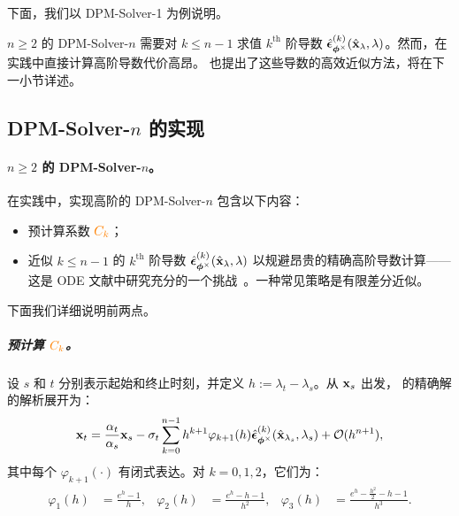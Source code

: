 下面，我们以 DPM-Solver-1 为例说明。



$n \ge 2$ 的 DPM-Solver-$n$ 需要对 $k \le n-1$ 求值 $k^{\text{th}}$ 阶导数 {\color{cyan}$\hat{\bm{\epsilon}}_{\bm{\phi}^\times}^{(k)}(\hat{{\mathbf{x}}}_\lambda, \lambda)$}。然而，在实践中直接计算高阶导数代价高昂。\citet{lu2022dpm} 也提出了这些导数的高效近似方法，将在下一小节详述。

 
\subsection{DPM-Solver-$n$ 的实现}\label{subsec:dpm-n-method} 

\paragraph{$n \ge 2$ 的 DPM-Solver-$n$。}
在实践中，实现高阶的 DPM-Solver-$n$ 包含以下内容：
\begin{itemize}
    \item 预计算系数 ${\color{orange}C_k}$；
    \item 近似 $k \le n-1$ 的 $k^{\text{th}}$ 阶导数 {\color{cyan}$\hat{\bm{\epsilon}}_{\bm{\phi}^\times}^{(k)}(\hat{{\mathbf{x}}}_\lambda,\lambda)$} 以规避昂贵的精确高阶导数计算——这是 ODE 文献中研究充分的一个挑战~\citep{hochbruck2005explicit,luan2021efficient}。一种常见策略是有限差分近似。
\end{itemize}

下面我们详细说明前两点。


\subparagraph{预计算 ${\color{orange}C_k}$。} 
设 $s$ 和 $t$ 分别表示起始和终止时刻，并定义 $h := \lambda_t - \lambda_s$。从 ${\mathbf{x}}_s$ 出发， 的精确解的解析展开为：
\begin{equation}
\label{eq:analytic_expansion}
    {\mathbf{x}}_{t} = \frac{\alpha_{t}}{\alpha_{s}}{\mathbf{x}}_{s} - \sigma_{t} \sum_{k=0}^{n-1} h^{k+1} \varphi_{k+1}(h) \hat{\bm{\epsilon}}_{\bm{\phi}^\times}^{(k)}(\hat{{\mathbf{x}}}_{\lambda_{s}}, \lambda_{s}) + \mathcal{O}(h^{n+1}),
\end{equation}
其中每个 $\varphi_{k+1}(\cdot)$ 有闭式表达。对 $k = 0, 1, 2$，它们为：
\begin{align*}
\varphi_1(h) &= \frac{e^h - 1}{h}, &
\varphi_2(h) &= \frac{e^h - h - 1}{h^2}, &
\varphi_3(h) &= \frac{e^h - \frac{h^2}{2} - h - 1}{h^3}.
\end{align*}

